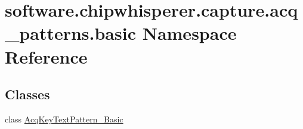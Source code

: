 \hypertarget{namespacesoftware_1_1chipwhisperer_1_1capture_1_1acq__patterns_1_1basic}{}\section{software.\+chipwhisperer.\+capture.\+acq\+\_\+patterns.\+basic Namespace Reference}
\label{namespacesoftware_1_1chipwhisperer_1_1capture_1_1acq__patterns_1_1basic}
\subsection*{Classes}
\begin{DoxyCompactItemize}
\item 
class \hyperlink{classsoftware_1_1chipwhisperer_1_1capture_1_1acq__patterns_1_1basic_1_1AcqKeyTextPattern__Basic}{Acq\+Key\+Text\+Pattern\+\_\+\+Basic}
\end{DoxyCompactItemize}
